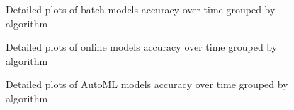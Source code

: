 \documentclass{sig-alternate-br}
\begin{document}
\begin{figure}[h]
\centering 
{}
\caption{Detailed plots of batch models accuracy over time grouped by algorithm}
\label{fig:batchall}
\end{figure}

\begin{figure}[h]
\centering 
{}
\caption{Detailed plots of online models accuracy over time grouped by algorithm}
\label{fig:online_all}
\end{figure}

\begin{figure}[]
\centering 
{}
\caption{Detailed plots of AutoML models accuracy over time grouped by algorithm}
\label{fig:batchall}
\end{figure}
\end{document}
